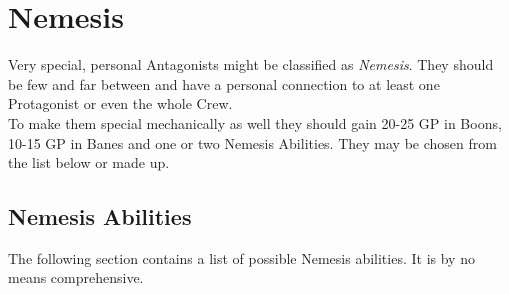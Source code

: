 \documentclass[12pt,a4paper,openany,usenames,dvipsnames]{book}
\begin{document}
	\chapter{Nemesis}
	\label{ch:nemesis}
	Very special, personal Antagonists might be classified as \emph{Nemesis}.
	They should be few and far between and have a personal connection to at least one Protagonist or even the whole Crew.
	\\%
	To make them special mechanically as well they should gain 20-25 GP in Boons,
		10-15 GP in Banes
		and one or two Nemesis Abilities.
	They may be chosen from the list below or made up.
	\section*{Nemesis Abilities}
	The following section contains a list of possible Nemesis abilities. It is by no means comprehensive.\\
\end{document}
